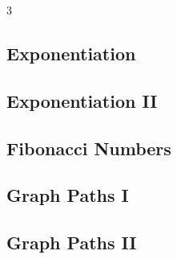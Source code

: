 \documentclass[8pt]{extarticle}
\begin{document}
\begin{multicols*}{3}
\subsection{Exponentiation}
\begin{caixaenunciado}

\end{caixaenunciado}
\vspace{0.3cm}


\subsection{Exponentiation II}
\begin{caixaenunciado}

\end{caixaenunciado}
\vspace{0.3cm}


\subsection{Fibonacci Numbers}
\begin{caixaenunciado}

\end{caixaenunciado}
\vspace{0.3cm}


\subsection{Graph Paths I}
\begin{caixaenunciado}

\end{caixaenunciado}
\vspace{0.3cm}


\subsection{Graph Paths II}
\begin{caixaenunciado}

\end{caixaenunciado}
\vspace{0.3cm}



\end{multicols*}
\end{document}
